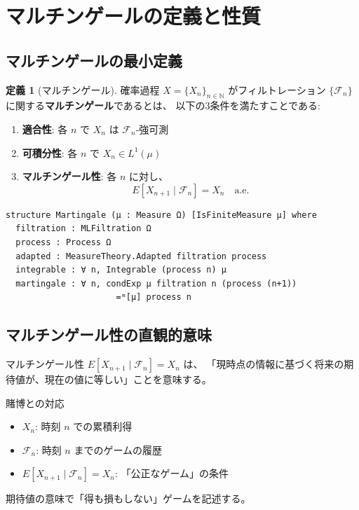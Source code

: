 \documentclass[a4paper,12pt]{ltjsarticle}
\theoremstyle{definition}
\newtheorem{definition}{定義}[section]
\begin{document}
\section{マルチンゲールの定義と性質}

\subsection{マルチンゲールの最小定義}

\begin{definition}[マルチンゲール]\label{def:martingale}
確率過程 $X = \{X_n\}_{n \in \mathbb{N}}$ がフィルトレーション
$\{\mathcal{F}_n\}$ に関する\textbf{マルチンゲール}であるとは、
以下の3条件を満たすことである:
\begin{enumerate}
\item \textbf{適合性}: 各 $n$ で $X_n$ は $\mathcal{F}_n$-強可測
\item \textbf{可積分性}: 各 $n$ で $X_n \in L^1(\mu)$
\item \textbf{マルチンゲール性}: 各 $n$ に対し、
\[
E[X_{n+1} \mid \mathcal{F}_n] = X_n \quad \text{a.e.}
\]
\end{enumerate}
\end{definition}

\begin{codebox}
\small
\begin{verbatim}
structure Martingale (μ : Measure Ω) [IsFiniteMeasure μ] where
  filtration : MLFiltration Ω
  process : Process Ω
  adapted : MeasureTheory.Adapted filtration process
  integrable : ∀ n, Integrable (process n) μ
  martingale : ∀ n, condExp μ filtration n (process (n+1))
                      =ᵐ[μ] process n
\end{verbatim}
\end{codebox}

\subsection{マルチンゲール性の直観的意味}

マルチンゲール性 $E[X_{n+1} \mid \mathcal{F}_n] = X_n$ は、
「現時点の情報に基づく将来の期待値が、現在の値に等しい」ことを意味する。

\begin{mainbox}{賭博との対応}
\begin{itemize}
\item $X_n$: 時刻 $n$ での累積利得
\item $\mathcal{F}_n$: 時刻 $n$ までのゲームの履歴
\item $E[X_{n+1} \mid \mathcal{F}_n] = X_n$: 「公正なゲーム」の条件
\end{itemize}
期待値の意味で「得も損もしない」ゲームを記述する。
\end{mainbox}
\end{document}
